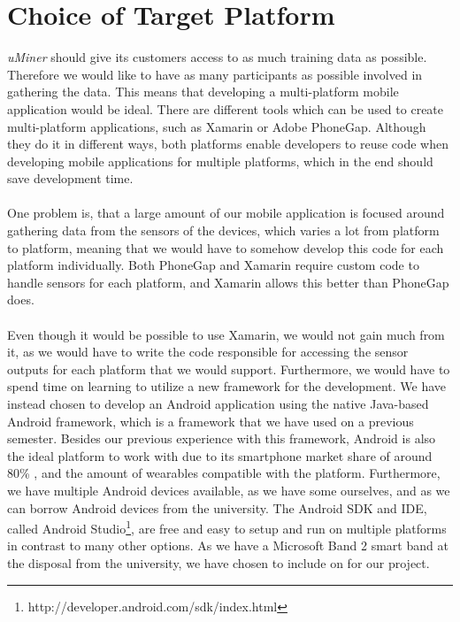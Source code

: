 
\section{Choice of Target Platform}
\label{sec:choice_of_platform}

\emph{uMiner} should give its customers access to as much training data as possible. Therefore we would like to have as many participants as possible involved in gathering the data. This means that developing a multi-platform mobile application would be ideal. There are different tools which can be used to create multi-platform applications, such as Xamarin or Adobe PhoneGap. Although they do it in different ways, both platforms enable developers to reuse code when developing mobile applications for multiple platforms, which in the end should save development time. 
\\\\
One problem is, that a large amount of our mobile application is focused around gathering data from the sensors of the devices, which varies a lot from platform to platform, meaning that we would have to somehow develop this code for each platform individually. Both PhoneGap and Xamarin require custom code to handle sensors for each platform, and Xamarin allows this better than PhoneGap does. 
\\\\
Even though it would be possible to use Xamarin, we would not gain much from it, as we would have to write the code responsible for accessing the sensor outputs for each platform that we would support. Furthermore, we would have to spend time on learning to utilize a new framework for the development. We have instead chosen to develop an Android application using the native Java-based Android framework, which is a framework that we have used on a previous semester. Besides our previous experience with this framework, Android is also the ideal platform to work with due to its smartphone market share of around 80\% \parencite{android_os_market_share}, and the amount of wearables compatible with the platform. Furthermore, we have multiple Android devices available, as we have some ourselves, and as we can borrow Android devices from the university. The Android SDK and IDE, called Android Studio\footnote{http://developer.android.com/sdk/index.html}, are free and easy to setup and run on multiple platforms in contrast to many other options. As we have a Microsoft Band 2 smart band at the disposal from the university, we have chosen to include on for our project.
